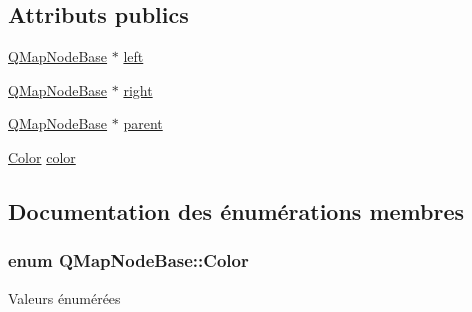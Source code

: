 \subsection*{Attributs publics}
\begin{DoxyCompactItemize}
\item 
\hyperlink{struct_q_map_node_base}{Q\+Map\+Node\+Base} $\ast$ \hyperlink{struct_q_map_node_base_a5334085d1e9ededc044ea0b5551ed7fd}{left}
\item 
\hyperlink{struct_q_map_node_base}{Q\+Map\+Node\+Base} $\ast$ \hyperlink{struct_q_map_node_base_a8eae5d979c668347872c31b956626a68}{right}
\item 
\hyperlink{struct_q_map_node_base}{Q\+Map\+Node\+Base} $\ast$ \hyperlink{struct_q_map_node_base_a681ee5099626a90f1ecb5ae13ac168fd}{parent}
\item 
\hyperlink{struct_q_map_node_base_a8d262e109c5db0292c19141d585c96a9}{Color} \hyperlink{struct_q_map_node_base_a627d1bae805ea408334d5131362b8b60}{color}
\end{DoxyCompactItemize}


\subsection{Documentation des énumérations membres}
\hypertarget{struct_q_map_node_base_a8d262e109c5db0292c19141d585c96a9}{}
\subsubsection[{Color}]{\setlength{\rightskip}{0pt plus 5cm}enum {\bf Q\+Map\+Node\+Base\+::\+Color}}\label{struct_q_map_node_base_a8d262e109c5db0292c19141d585c96a9}
\begin{Desc}
\item[Valeurs énumérées]\par
\begin{description}
\item[{\em 
\hypertarget{struct_q_map_node_base_a8d262e109c5db0292c19141d585c96a9a9bffc80754cb87fa880417571e785e1b}{}Red\label{struct_q_map_node_base_a8d262e109c5db0292c19141d585c96a9a9bffc80754cb87fa880417571e785e1b}
}]\item[{\em 
\hypertarget{struct_q_map_node_base_a8d262e109c5db0292c19141d585c96a9a4a3c720b5a1ffee5b349ac2da8c5a2e1}{}Black\label{struct_q_map_node_base_a8d262e109c5db0292c19141d585c96a9a4a3c720b5a1ffee5b349ac2da8c5a2e1}
}]\end{description}
\end{Desc}


